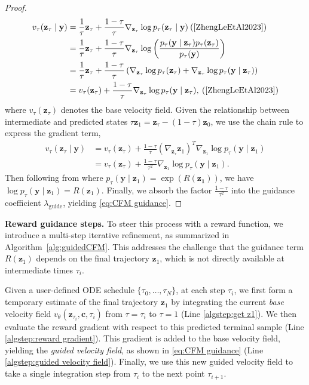 \documentclass[letterpaper,10 pt,conference]{ieeeconf}
\begin{document}
\begin{proof}
\vspace{-3mm}
{\small
\begin{align*}
    v_\tau(\mathbf{z}_\tau\mid\mathbf{y}) &= \frac{1}{\tau}\mathbf{z}_\tau+\frac{1-\tau}{\tau}\nabla_{\mathbf{z}_\tau}\log p_\tau(\mathbf{z}_\tau\mid\mathbf{y}) \: \text{(\cite[Lem.~1]{ZhengLeEtAl2023})}\\
    &= \frac{1}{\tau}\mathbf{z}_\tau+\frac{1-\tau}{\tau}\nabla_{\mathbf{z}_\tau}\log \left( \frac{p_\tau(\mathbf{y} \mid \mathbf{z}_\tau)p_\tau(\mathbf{z}_\tau)}{p_\tau(\mathbf{y})} \right)\\
    &=\frac{1}{\tau}\mathbf{z}_\tau+\frac{1-\tau}{\tau}\left(\nabla_{\mathbf{z}_\tau}\log p_\tau(\mathbf{z}_\tau)+\nabla_{\mathbf{z}_\tau}\log p_\tau(\mathbf{y}\mid\mathbf{z}_\tau)\right)\\
    &=v_\tau(\mathbf{z}_\tau)+\frac{1-\tau}{\tau}\nabla_{\mathbf{z}_\tau}\log p_\tau(\mathbf{y}\mid\mathbf{z}_\tau),  \: \text{(\cite[Lem.~1]{ZhengLeEtAl2023})}
\end{align*}
}
where $v_\tau(\mathbf{z}_\tau)$ denotes the base velocity field.
Given the relationship between intermediate and predicted states $\tau\mathbf{z}_1=\mathbf{z}_\tau-(1-\tau)\mathbf{z}_0$, we use the chain rule to express the gradient term,
\begin{align*}
    v_\tau(\mathbf{z}_\tau\mid\mathbf{y}) &=v_\tau(\mathbf{z}_\tau)+\frac{1-\tau}{\tau}(\nabla_{\mathbf{z}_\tau}\mathbf{z}_1)^T\nabla_{\mathbf{z}_1}\log p_\tau(\mathbf{y}\mid\mathbf{z}_1)\\
    &= v_\tau(\mathbf{z}_\tau)+\frac{1-\tau}{\tau^2}\nabla_{\mathbf{z}_1}\log p_\tau(\mathbf{y}\mid\mathbf{z}_1).
\end{align*}
Then following from \cite{JannerDuEtAl2022} where $p_\tau(\mathbf{y} \mid \mathbf{z}_1) = \exp \left(R(\mathbf{z_1})\right)$, we have $\log p_\tau(\mathbf{y}\mid\mathbf{z}_1) = R(\mathbf{z}_1)$.
Finally, we absorb the factor $\frac{1-\tau}{\tau^2}$ into the guidance coefficient $\lambda_\mathrm{guide}$, yielding \eqref{eq:CFM guidance}.
\end{proof}


\noindent\textbf{Reward guidance steps.} 
To steer this process with a reward function, we introduce a multi-step iterative refinement, as summarized in Algorithm~\ref{alg:guidedCFM}. 
This addresses the challenge that the guidance term $R(\mathbf{z}_1)$ depends on the final trajectory $\mathbf{z}_1$, which is not directly available at intermediate times $\tau_i$.

Given a user-defined ODE schedule $\{\tau_0,\ldots,\tau_N\}$, at each step $\tau_i$, we first form a temporary estimate of the final trajectory $\mathbf{z}_1$ by integrating the current \textit{base} velocity field $v_\theta(\mathbf{z}_{\tau_i}, \mathbf{c}, \tau_i)$ from $\tau=\tau_i$ to $\tau=1$ (Line \ref{algstep:get z1}).
We then evaluate the reward gradient with respect to this predicted terminal sample (Line \ref{algstep:reward gradient}).
This gradient is added to the base velocity field, yielding the \textit{guided velocity field}, as shown in \eqref{eq:CFM guidance} (Line \ref{algstep:guided velocity field}). 
Finally, we use this new guided velocity field to take a single integration step from $\tau_i$ to the next point $\tau_{i+1}$.
\end{document}
